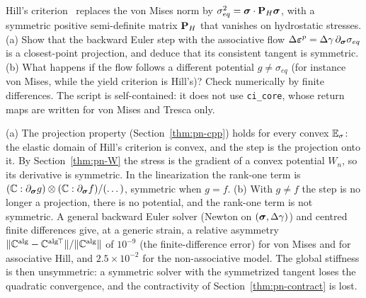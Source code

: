 \label{exo:pn-hill}
%
Hill's criterion~\cite{Hill1948} replaces the von Mises norm by
$\sigma_{eq}^2=\bm{\sigma}\cdot\mathbf{P}_H\bm{\sigma}$, with a symmetric positive
semi-definite matrix $\mathbf{P}_H$ that vanishes on hydrostatic stresses.
(a) Show that the backward Euler step with the associative flow
$\Delta\bm{\varepsilon}^{p}=\Delta\gamma\,\partial_{\bm{\sigma}}\sigma_{eq}$ is a closest-point projection, and
deduce that its consistent tangent is symmetric. (b) What happens if the flow
follows a different potential $g\ne\sigma_{eq}$ (for instance von Mises, while
the yield criterion is Hill's)? Check numerically by finite differences. The
script is self-contained: it does not use \texttt{ci\_core}, whose return maps
are written for von Mises and Tresca only.
\begin{solution}
(a) The projection property (Section~\ref{thm:pn-cpp}) holds for every convex $\mathbb{E}_{\sigma}$: the elastic
domain of Hill's criterion is convex, and the step is the projection onto it.
By Section~\ref{thm:pn-W} the stress is the gradient of a convex potential
$W_n$, so its derivative is symmetric. In the linearization the rank-one term
is $(\mathbb{C}:\partial_{\bm{\sigma}}g)\otimes(\mathbb{C}:\partial_{\bm{\sigma}}f)/(\dots)$, symmetric
when $g=f$. (b) With $g\ne f$ the step is no longer a projection, there is no
potential, and the rank-one term is not symmetric. A general backward Euler
solver (Newton on $(\bm{\sigma},\Delta\gamma)$) and centred finite differences give, at a
generic strain, a relative asymmetry $\lVert \mathbb{C}^{\mathrm{alg}}-\mathbb{C}^{\mathrm{alg}}{}^{\!\top}\rVert/\lVert \mathbb{C}^{\mathrm{alg}}\rVert$ of $10^{-9}$
(the finite-difference error) for von Mises and for associative Hill, and
$2.5\times10^{-2}$ for the non-associative model. The global stiffness is then
unsymmetric: a symmetric solver with the symmetrized tangent loses the
quadratic convergence, and the contractivity of
Section~\ref{thm:pn-contract} is lost.

\end{solution}


